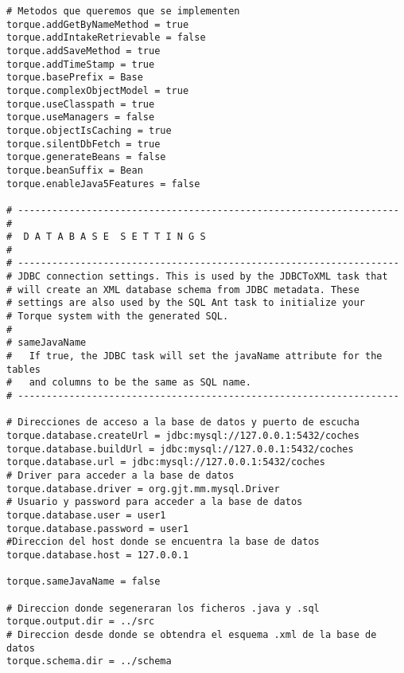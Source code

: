 \begin{lstlisting}
# Metodos que queremos que se implementen
torque.addGetByNameMethod = true
torque.addIntakeRetrievable = false
torque.addSaveMethod = true
torque.addTimeStamp = true
torque.basePrefix = Base
torque.complexObjectModel = true
torque.useClasspath = true
torque.useManagers = false
torque.objectIsCaching = true
torque.silentDbFetch = true
torque.generateBeans = false
torque.beanSuffix = Bean
torque.enableJava5Features = false

# -------------------------------------------------------------------
#
#  D A T A B A S E  S E T T I N G S
#
# -------------------------------------------------------------------
# JDBC connection settings. This is used by the JDBCToXML task that
# will create an XML database schema from JDBC metadata. These
# settings are also used by the SQL Ant task to initialize your
# Torque system with the generated SQL.
#
# sameJavaName
#   If true, the JDBC task will set the javaName attribute for the tables
#   and columns to be the same as SQL name.
# -------------------------------------------------------------------

# Direcciones de acceso a la base de datos y puerto de escucha
torque.database.createUrl = jdbc:mysql://127.0.0.1:5432/coches
torque.database.buildUrl = jdbc:mysql://127.0.0.1:5432/coches
torque.database.url = jdbc:mysql://127.0.0.1:5432/coches
# Driver para acceder a la base de datos
torque.database.driver = org.gjt.mm.mysql.Driver
# Usuario y password para acceder a la base de datos
torque.database.user = user1
torque.database.password = user1
#Direccion del host donde se encuentra la base de datos
torque.database.host = 127.0.0.1

torque.sameJavaName = false

# Direccion donde segeneraran los ficheros .java y .sql
torque.output.dir = ../src
# Direccion desde donde se obtendra el esquema .xml de la base de datos
torque.schema.dir = ../schema
\end{lstlisting}